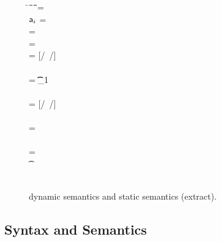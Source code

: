 \documentclass[USenglish]{tex/lipics-v2016}
\begin{document}
\begin{figure}[!h]
\begin{minipage}{\textwidth}
\begin{tabbing}
\K\HS \New{} \HS\=\s~\HS\=\Red\HS\=\K\HS\=\ap\HS~\= \sp\HS \= \WHERE\HS\= \fresh\ap \HS\HS\HS\HS\HS\HS\HS\=  \sp = {\Map{}}
\\
\K\HS \FReadR\a{\f[i]} \> \s           \>\Red\>     \K \>$\a[i]$ \> \s  \> \WHERE \>\App\s\a=\obj\C{\a[1],\ldots\a[i],\a[n]\ldots}
\\
\K\HS {\FWriteR\a{\f[i]}\ap} \> \s     \>\Red\>     \K \> \ap \> \sp \>  \WHERE \>\App\s\a=\obj\C{\a[1],\ldots\a[i],\a[n]\ldots} \HS  
\\ \> \> \> \> \> \> \> \sp = \Map\s{\Bind\a{\obj\C{\a[1],\ldots\ap,\a[n]\ldots}}}
\\
\K\HS{\KCall\a\m\ap\t\tp} \> \s      \>\Red\>     \K \>  \ep \> \s \> \WHERE\> \ep = {[\a/\this~{\ap/\x}]\e} \HS \\ \> \> \> \> \> \> \> \Mdef\m{}\e\In \App\K\C  \\ \> \> \> \> \> \> \>  \App\s\a=\obj{} \> \StrSub {\emptyset}\K\t {\t_{1}} \\ 
\> \> \> \> \> \> \> \StrSub {\emptyset} \tp
\\
 \K\HS {\DynCall\a\m\ap}\> \s        \>\Red\>    \K \> \ep \> \s \>  \WHERE\> \ep = {[\a/\this~{\ap/\x}]\e}\HS \\ \> \> \> \> \> \> \> \Mdef\m\x\any\any\e \In \App\K\C \\ \> \> \> \> \> \> \> \App\s\a=\obj{} 
\\
 \K\HS {\SubCast \any\a} \> \s       \>\Red\>   \K \> \a \> \s
\\
 \K\HS {\SubCast \D\a} \> \s        \>\Red\>    \K \> \a \> \s \>  \WHERE\> \StrSub {\emptyset}\K\C \D \>\App\s\a=\obj{} 
\\
 \K\HS {\BehCast \t\a} \> \s         \>\Red\>   \Kp \> \ap \> \sp \> \WHERE\> \behcast \a\t\s\K \Kp\ap\sp    
\\
\K \HS \EM{\EE[\e]} \> \s            \>\Red\>   \Kp \> \EM{\EE[\ep]} \> \sp \> \WHERE \> \K~\e~\s \Red~\Kp~\ep~\sp
\end{tabbing}
\end{minipage}

\medskip
\hrulefill
\caption{\kafka dynamic semantics and static semantics
  (extract).}\label{fig:kafka}
\end{figure}


\subsection{Syntax and Semantics}
\end{document}

